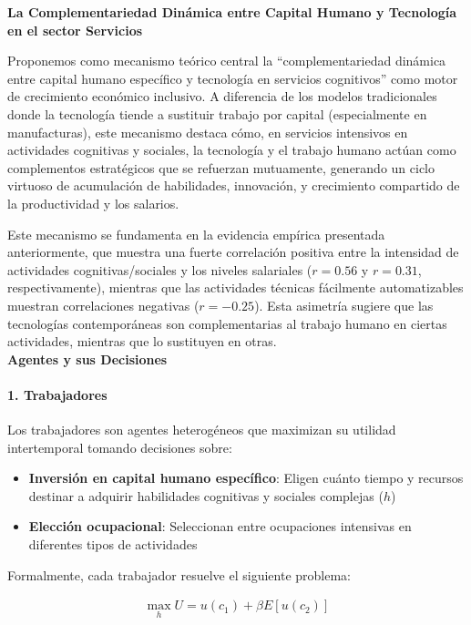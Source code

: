 \documentclass{article}
\theoremstyle{remark}
\theoremstyle{definition}
\begin{document}
\begin{tcolorbox}
\textbf{La Complementariedad Dinámica entre Capital Humano y Tecnología en el sector Servicios} 

Proponemos como mecanismo teórico central la ``complementariedad dinámica entre capital humano específico y tecnología en servicios cognitivos'' como motor de crecimiento económico inclusivo. A diferencia de los modelos tradicionales donde la tecnología tiende a sustituir trabajo por capital (especialmente en manufacturas), este mecanismo destaca cómo, en servicios intensivos en actividades cognitivas y sociales, la tecnología y el trabajo humano actúan como complementos estratégicos que se refuerzan mutuamente, generando un ciclo virtuoso de acumulación de habilidades, innovación, y crecimiento compartido de la productividad y los salarios.

Este mecanismo se fundamenta en la evidencia empírica presentada anteriormente, que muestra una fuerte correlación positiva entre la intensidad de actividades cognitivas/sociales y los niveles salariales ($r = 0.56$ y $r = 0.31$, respectivamente), mientras que las actividades técnicas fácilmente automatizables muestran correlaciones negativas ($r = -0.25$). Esta asimetría sugiere que las tecnologías contemporáneas son complementarias al trabajo humano en ciertas actividades, mientras que lo sustituyen en otras. \\

\textbf{Agentes y sus Decisiones}

\paragraph{1. Trabajadores}
Los trabajadores son agentes heterogéneos que maximizan su utilidad intertemporal tomando decisiones sobre:

\begin{itemize}
\item \textbf{Inversión en capital humano específico}: Eligen cuánto tiempo y recursos destinar a adquirir habilidades cognitivas y sociales complejas ($h$)
\item \textbf{Elección ocupacional}: Seleccionan entre ocupaciones intensivas en diferentes tipos de actividades
\end{itemize}

Formalmente, cada trabajador resuelve el siguiente problema:

\begin{align}
\max_{h} U = u(c_1) + \beta E[u(c_2)]
\end{align}


\end{tcolorbox}
\end{document}
